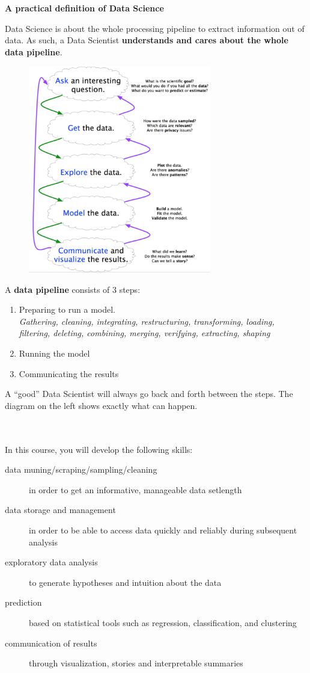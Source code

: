 \documentclass[a4paper,11pt,twoside]{article}
\begin{document}
{\bf A practical definition of Data Science} 

Data Science is about the whole processing pipeline to extract information out of data. As such, a Data Scientist {\bf understands and cares about the whole data pipeline}.

\begin{minipage}{0.5\textwidth}
\begin{figure}[H]
 \centering
 \includegraphics[width=8cm]{./pic/pipeline.png}
\end{figure}
\end{minipage} \hfill
\begin{minipage}{0.45\textwidth}
A {\bf data pipeline} consists of 3 steps:
\begin{enumerate}
 \item Preparing to run a model. \\
  {\it Gathering, cleaning, integrating, restructuring, transforming, loading, filtering, deleting, combining, merging, verifying, extracting, shaping}
 \item Running the model
 \item Communicating the results
\end{enumerate}
\vspace{0.5cm}
 A ``good'' Data Scientist will always go back and forth between the steps. The diagram on the left shows exactly what can happen. 
\end{minipage}
\\ \\
In this course, you will develop the following skills:
\begin{description}
 \item[data muning/scraping/sampling/cleaning] in order to get an informative, manageable data setlength
 \item[data storage and management] in order to be able to access data quickly and reliably during subsequent analysis
 \item[exploratory data analysis] to generate hypotheses and intuition about the data
 \item[prediction] based on statistical tools such as regression, classification, and clustering
 \item[communication of results] through visualization, stories and interpretable summaries
\end{description}
\end{document}
